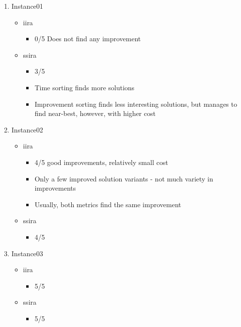 \begin{enumerate}
    \item Instance01
    \begin{itemize}
        \item \ac{iira}
        \begin{itemize}
            \item 0/5 Does not find any improvement
        \end{itemize}

        \item \ac{ssira}
        \begin{itemize}
            \item 3/5
            \item Time sorting finds more solutions
            \item Improvement sorting finds less interesting solutions, but manages to find near-best, however, with higher cost
        \end{itemize}
    \end{itemize}

    \item Instance02
    \begin{itemize}
        \item \ac{iira}
        \begin{itemize}
            \item 4/5 good improvements, relatively small cost
            \item Only a few improved solution variants - not much variety in improvements
            \item Usually, both metrics find the same improvement
        \end{itemize}

        \item \ac{ssira}
        \begin{itemize}
            \item 4/5
        \end{itemize}
    \end{itemize}

    \item Instance03
    \begin{itemize}
        \item \ac{iira}
        \begin{itemize}
            \item 5/5
        \end{itemize}

        \item \ac{ssira}
        \begin{itemize}
            \item 5/5
        \end{itemize}
    \end{itemize}


\end{enumerate}
